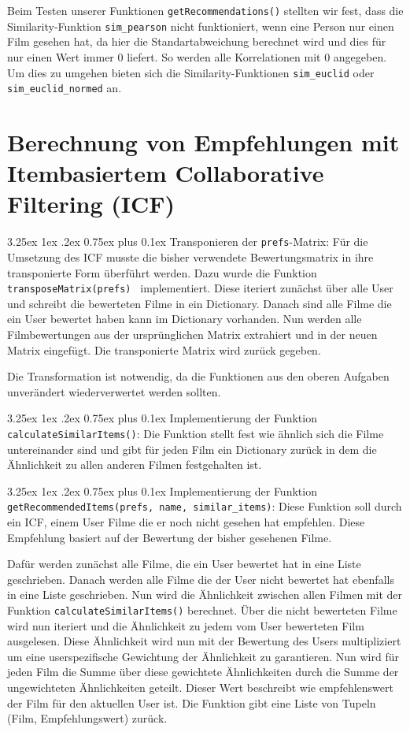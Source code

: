 \documentclass[12pt,a4paper]{scrartcl}
\makeatletter
\renewcommand\subparagraph{\@startsection{subparagraph}{5}{\parindent}%
    {3.25ex \@plus1ex \@minus .2ex}%
    {0.75ex plus 0.1ex}%
    {\normalfont\normalsize\bfseries}}
\makeatother
\begin{document}
Beim Testen unserer Funktionen \lstinline{getRecommendations()} stellten wir fest, dass die Similarity-Funktion \lstinline{sim_pearson} nicht funktioniert, wenn eine Person nur einen Film gesehen hat, da hier die Standartabweichung berechnet wird und dies f\"ur nur einen Wert immer 0 liefert. So werden alle Korrelationen mit 0 angegeben. 
Um dies zu umgehen bieten sich die Similarity-Funktionen \lstinline{sim_euclid} oder \lstinline{sim_euclid_normed} an.


\section*{Berechnung von Empfehlungen mit Itembasiertem Collaborative Filtering (ICF)}
\subparagraph{Transponieren der \lstinline{prefs}-Matrix:}
F\"ur die Umsetzung des ICF musste die bisher verwendete Bewertungsmatrix in ihre transponierte Form \"uberf\"uhrt werden. Dazu wurde die Funktion \lstinline{transposeMatrix(prefs) } implementiert. Diese iteriert zun\"achst \"uber alle User und schreibt die bewerteten Filme in ein Dictionary. Danach sind alle Filme die ein User bewertet haben kann im Dictionary vorhanden. Nun werden alle Filmbewertungen aus der urspr\"unglichen Matrix extrahiert und in der neuen Matrix eingef\"ugt.
Die transponierte Matrix wird zur\"uck gegeben.

Die Transformation ist notwendig, da die Funktionen aus den oberen Aufgaben unver\"andert wiederverwertet werden sollten. 

\subparagraph{Implementierung der Funktion \lstinline{calculateSimilarItems()}:}
Die Funktion stellt fest wie \"ahnlich sich die Filme untereinander sind und gibt f\"ur jeden Film ein Dictionary zur\"uck in dem die \"Ahnlichkeit zu allen anderen Filmen festgehalten ist.

\subparagraph{Implementierung der Funktion \lstinline{getRecommendedItems(prefs, name, similar_items)}:}
Diese Funktion soll durch ein ICF, einem User Filme die er noch nicht gesehen hat empfehlen. Diese Empfehlung basiert auf der Bewertung der bisher gesehenen Filme. 

Daf\"ur werden zun\"achst alle Filme, die ein User bewertet hat in eine Liste geschrieben. Danach werden alle Filme die der User nicht bewertet hat ebenfalls in eine Liste geschrieben. 
Nun wird die \"Ahnlichkeit zwischen allen Filmen mit der Funktion \lstinline{calculateSimilarItems()} berechnet. \"Uber die nicht bewerteten Filme wird nun iteriert und die \"Ahnlichkeit zu jedem vom User bewerteten Film ausgelesen. Diese \"Ahnlichkeit wird nun mit der Bewertung des Users multipliziert um eine userspezifische Gewichtung der \"Ahnlichkeit zu garantieren. Nun wird f\"ur jeden Film die Summe \"uber diese gewichtete \"Ahnlichkeiten durch die Summe der ungewichteten \"Ahnlichkeiten geteilt. Dieser Wert beschreibt wie empfehlenswert der Film f\"ur den aktuellen User ist.
Die Funktion gibt eine Liste von Tupeln (Film, Empfehlungswert)  zur\"uck. 
\end{document}
